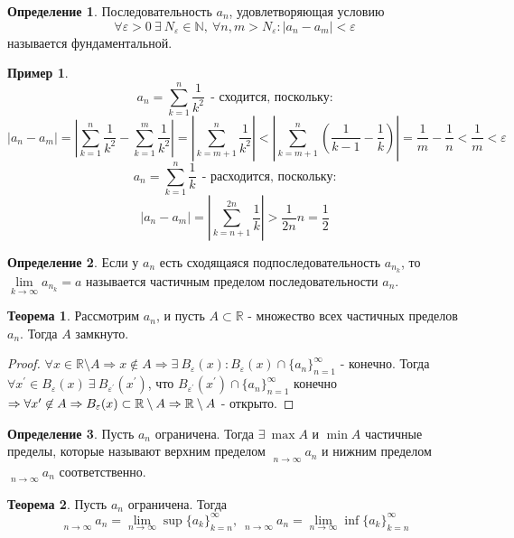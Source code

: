 \documentclass[a4paper, 12pt]{article}
\newcommand{\N}{\mathbb{N}}
\newcommand{\R}{\mathbb{R}}
\renewcommand{\epsilon}{\varepsilon}
\newcommand{\lims}{\lim\limits_{n\to \infty}}
\DeclareMathOperator*\lowlim{\underline{lim}}
\DeclareMathOperator*\uplim{\overline{lim}}
\theoremstyle{definition}
\newtheorem*{definition}{Определение}
\newtheorem*{theorem}{Теорема}
\newtheorem*{example}{Пример}
\begin{document}
        \begin{definition}
            Последовательность $a_n$, удовлетворяющая условию
            \[\forall \epsilon>0\ \exists\ N_{\epsilon}\in \N,\ \forall n,m>N_{\epsilon}: |a_n-a_m|<\epsilon\]
            называется фундаментальной.
        \end{definition} 
        \begin{example}
                \[a_n=\sum\limits_{k=1}^n\frac{1}{k^2}\ \ \text{- сходится, поскольку:}\] 
                \[|a_n-a_m|=|\sum\limits_{k=1}^n\frac{1}{k^2}-\sum\limits_{k=1}^m\frac{1}{k^2}|=|\sum\limits_{k=m+1}^n\frac{1}{k^2}|<|\sum\limits_{k=m+1}^n (\frac{1}{k-1}-\frac{1}{k})|=\frac{1}{m}-\frac{1}{n}<\frac{1}{m}<\epsilon\]
                \[a_n=\sum\limits_{k=1}^n\frac{1}{k}\ \ \text{- расходится, поскольку:}\]
                \[|a_n-a_m|=|\sum\limits_{k=n+1}^{2n}\frac{1}{k}|>\frac{1}{2n}n=\frac{1}{2}\]
        \end{example}
        \begin{definition}
            Если у $a_n$ есть сходящаяся подпоследовательность $a_{n_k}$, то\\ $\lim\limits_{k\to \infty}a_{n_k}=a$ называется частичным пределом последовательности $a_n$.
        \end{definition} 
        \begin{theorem}
            Рассмотрим $a_n$, и пусть $A\subset \R$ - множество всех частичных пределов $a_n$. Тогда $A$ замкнуто.
        \end{theorem} 
        \begin{proof}
            $\forall x\in \R\setminus A \Rightarrow x\not\in A \Rightarrow \exists\ B_{\epsilon}(x): B_{\epsilon}(x)\cap\{a_n\}_{n=1}^{\infty}$ - конечно. Тогда $\forall x^{\prime}\in B_{\epsilon}(x)\ \exists\ B_{\epsilon^{\prime}}(x^{\prime})$, что $B_{\epsilon^{\prime}}(x^{\prime})\cap\{a_n\}_{n=1}^{\infty}$ конечно $\Rightarrow \forall x^{\prime} \not\in A\\ \Rightarrow B_{\epsilon}(x)\subset \R\setminus A\Rightarrow \R\setminus A$ - открыто.
        \end{proof} 
        \begin{definition}
            Пусть $a_n$ ограничена. Тогда $\exists\ \max A$ и $\min A$ частичные пределы, которые называют верхним пределом $\uplim\limits_{n\to \infty}a_n$ и нижним пределом $\lowlim\limits_{n\to \infty}a_n$ соответственно. 
        \end{definition} 
        \begin{theorem}
            Пусть  $a_n$ ограничена. Тогда 
            \[\uplim\limits_{n\to \infty}a_n=\lims \sup\{a_k\}_{k=n}^{\infty},\ \lowlim\limits_{n\to \infty}a_n=\lims \inf\{a_k\}_{k=n}^{\infty}\]
        \end{theorem} 
\end{document}
